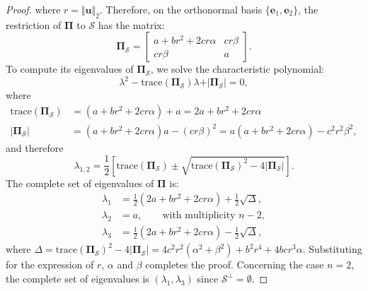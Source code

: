 \documentclass[a4paper, 12pt]{article}
\def\be{\boldsymbol{e}}
\def\be{\mathbf{e}}
\begin{document}
\begin{proof}
%
where $r = \Vert\boldsymbol{u}\Vert_2$.
%
Therefore, on the orthonormal basis $\{\be_1, \be_2\}$, the restriction of $ \boldsymbol{\Pi} $ to $ \mathcal{S}$ has the matrix:
\[
\boldsymbol{\Pi}_{\mathcal{S}} =
\begin{bmatrix}
a+br^2+2cr\alpha & cr\beta \\
cr\beta & a
\end{bmatrix}.
\]
%
To compute its eigenvalues of $\boldsymbol{\Pi}_{\mathcal{S}}$, we solve the characteristic polynomial:
$$
\lambda^2-\mathrm{trace}\left(\boldsymbol{\Pi}_{\mathcal{S}}\right) \lambda+\vert\boldsymbol{\Pi}_{\mathcal{S}}\vert=0,
$$
where
$$
\begin{aligned}
\mathrm{trace}\left(\boldsymbol{\Pi}_{\mathcal{S}}\right)&=\left(a+b r^2+2 c r \alpha\right)+a=2 a+b r^2+2 c r \alpha\\
%
\vert\boldsymbol{\Pi}_{\mathcal{S}}\vert&=\left(a+b r^2+2 c r \alpha\right)a-(c r \beta)^2=a\left(a+b r^2+2 c r \alpha\right)-c^2 r^2 \beta^2,
\end{aligned}
$$
and therefore
$$
\lambda_{1,2}=\frac{1}{2}\left[\mathrm{trace}\left(\boldsymbol{\Pi}_{\mathcal{S}}\right) \pm \sqrt{\mathrm{trace}\left(\boldsymbol{\Pi}_{\mathcal{S}}\right)^2-4 \vert\boldsymbol{\Pi}_{\mathcal{S}}\vert}\right].
$$
The complete set of eigenvalues of $\boldsymbol{\Pi}$ is:
\begin{align*}
\lambda_1 &= \frac{1}{2}(2 a+b r^2+2 c r \alpha) + \frac{1}{2}\sqrt{\Delta}, \\
\lambda_2 &= a, \qquad \text{with multiplicity } n - 2, \\
\lambda_3 &= \frac{1}{2}(2 a+b r^2+2 c r \alpha) - \frac{1}{2}\sqrt{\Delta},
\end{align*}
where $\Delta=\mathrm{trace}\left(\boldsymbol{\Pi}_{\mathcal{S}}\right)^2-4 \vert\boldsymbol{\Pi}_{\mathcal{S}}\vert=4c^2r^2(\alpha^2+\beta^2)+b^2r^4+4bcr^3\alpha$. Substituting for the expression of $r$, $\alpha$ and $\beta$ completes the proof. Concerning the case $n=2$, the complete set of eigenvalues is $(\lambda_1, \lambda_3)$ since $\mathcal{S}^\perp = \emptyset$.
\end{proof}
\end{document}
